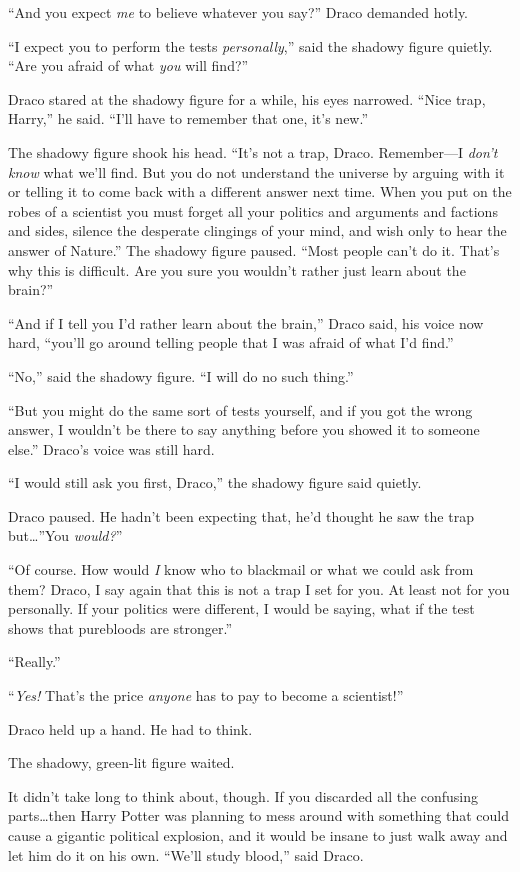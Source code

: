 “And you expect \emph{me} to believe whatever you say?” Draco demanded hotly.

“I expect you to perform the tests \emph{personally},” said the shadowy figure quietly. “Are you afraid of what \emph{you} will find?”

Draco stared at the shadowy figure for a while, his eyes narrowed. “Nice trap, Harry,” he said. “I’ll have to remember that one, it’s new.”

The shadowy figure shook his head. “It’s not a trap, Draco. Remember—I \emph{don’t know} what we’ll find. But you do not understand the universe by arguing with it or telling it to come back with a different answer next time. When you put on the robes of a scientist you must forget all your politics and arguments and factions and sides, silence the desperate clingings of your mind, and wish only to hear the answer of Nature.” The shadowy figure paused. “Most people can’t do it. That’s why this is difficult. Are you sure you wouldn’t rather just learn about the brain?”

“And if I tell you I’d rather learn about the brain,” Draco said, his voice now hard, “you’ll go around telling people that I was afraid of what I’d find.”

“No,” said the shadowy figure. “I will do no such thing.”

“But you might do the same sort of tests yourself, and if you got the wrong answer, I wouldn’t be there to say anything before you showed it to someone else.” Draco’s voice was still hard.

“I would still ask you first, Draco,” the shadowy figure said quietly.

Draco paused. He hadn’t been expecting that, he’d thought he saw the trap but…”You \emph{would?}”

“Of course. How would \emph{I} know who to blackmail or what we could ask from them? Draco, I say again that this is not a trap I set for you. At least not for you personally. If your politics were different, I would be saying, what if the test shows that purebloods are stronger.”

“Really.”

“\emph{Yes!} That’s the price \emph{anyone} has to pay to become a scientist!”

Draco held up a hand. He had to think.

The shadowy, green-lit figure waited.

It didn’t take long to think about, though. If you discarded all the confusing parts…then Harry Potter was planning to mess around with something that could cause a gigantic political explosion, and it would be insane to just walk away and let him do it on his own. “We’ll study blood,” said Draco.

